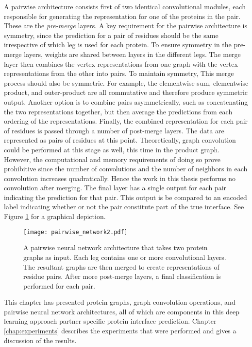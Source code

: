 A pairwise architecture consists first of two identical convolutional modules, each responsible for generating the representation for one of the proteins in the pair.
These are the \emph{pre-merge} layers.
A key requirement for the pairwise architecture is symmetry, since the prediction for a pair of residues should be the same irrespective of which leg is used for each protein.
To ensure symmetry in the pre-merge layers, weights are shared between layers in the different legs.
The merge layer then combines the vertex representations from one graph with the vertex representations from the other into pairs.
To maintain symmetry, This merge process should also be symmetric.
For example, the elementwise sum, elementwise product, and outer-product are all commutative and therefore produce symmetric output.
Another option is to combine pairs asymmetrically, such as concatenating the two representations together, but then average the predictions from each ordering of the representations.
Finally, the combined representation for each pair of residues is passed through a number of post-merge layers.
The data are represented as pairs of residues at this point. 
Theoretically, graph convolution could be performed at this stage as well, this time in the product graph.
However, the computational and memory requirements of doing so prove prohibitive since the number of convolutions and the number of neighbors in each convolution increases quadratically.
Hence the work in this thesis performs no convolution after merging.
The final layer has a single output for each pair indicating the prediction for that pair.
This output is be compared to an encoded label indicating whether or not the pair constitute part of the true interface. 
See Figure \ref{fig:pairwise_arch1} for a graphical depiction.

\begin{figure}
	\texttt{[image: pairwise\_network2.pdf]}
	\caption{A pairwise neural network architecture that takes two protein graphs as input. Each leg contains one or more convolutional layers. The resultant graphs are then merged to create representations of residue pairs. After more post-merge layers, a final classification is performed for each pair.}
	\label{fig:pairwise_arch1}
\end{figure}


This chapter has presented protein graphs, graph convolution operations, and pairwise neural network architectures, all of which are components in this deep learning approach partner specific protein interface prediction.
Chapter \ref{chap:experiments} describes the experiments that were performed and gives a discussion of the results.
